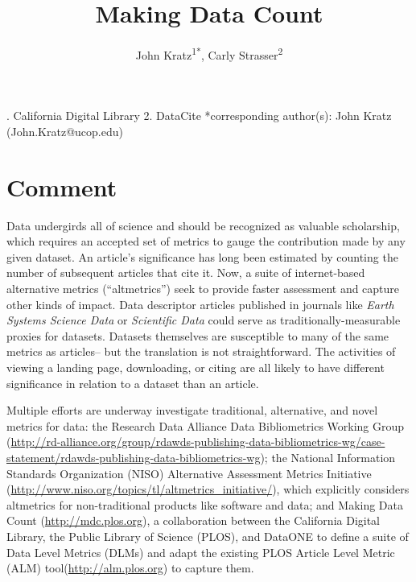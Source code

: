 \documentclass[english]{article}
\begin{document}
\title{Making Data Count}


\author{John Kratz\textsuperscript{1{*}}, Carly Strasser\textsuperscript{2}}

. California Digital Library 2. DataCite 
{*}corresponding author(s): John Kratz (John.Kratz@ucop.edu)


\section*{Comment}


Data undergirds all of science and should be recognized as valuable scholarship, which requires an accepted set of metrics to gauge the contribution made by any given dataset.
An article's significance has long been estimated by counting the number of subsequent articles that cite it. 
Now, a suite of internet-based alternative metrics (``altmetrics'') seek to provide faster assessment and capture other kinds of impact\cite{priem_altmetrics_2012}.
Data descriptor articles published in journals like \textit{Earth Systems Science Data} or \textit{Scientific Data} could serve as traditionally-measurable proxies for datasets\cite{pfeiffenberger_earth_2011, editors_more_2014}.
Datasets themselves are susceptible to many of the same metrics as articles-- but the translation is not straightforward.
The activities of viewing a landing page, downloading, or citing are all likely to have different significance in relation to a dataset than an article.

Multiple efforts are underway investigate traditional, alternative, and novel metrics for data: the Research Data Alliance Data Bibliometrics Working Group (\url{http://rd-alliance.org/group/rdawds-publishing-data-bibliometrics-wg/case-statement/rdawds-publishing-data-bibliometrics-wg}{}); the National Information Standards Organization (NISO) Alternative Assessment Metrics Initiative (\url{http://www.niso.org/topics/tl/altmetrics_initiative/}), which explicitly considers altmetrics for non-traditional products like software and data; and Making Data Count (\url{http://mdc.plos.org}), a collaboration between the California Digital Library, the Public Library of Science (PLOS), and DataONE to define a suite of Data Level Metrics (DLMs) and adapt the existing PLOS Article Level Metric (ALM) tool(\url{http://alm.plos.org}) to capture them.
\end{document}
